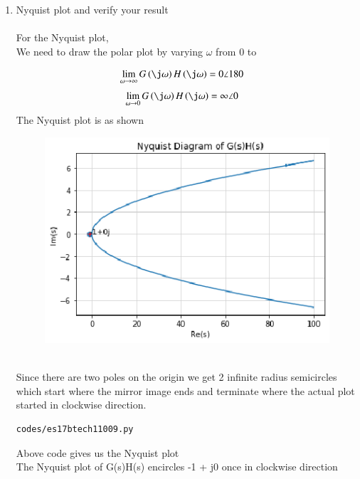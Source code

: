 \begin{enumerate}[label=\thesection.\arabic*.,ref=\thesection.\theenumi]
\item Nyquist plot and verify your result
\\
\solution
\\ For the Nyquist plot, 
\\
We need to draw the polar plot by varying $\omega$ from 0 to \infty

\begin{align}
 \lim_{\omega\to \infty}{G\brak{\j\omega}H\brak{\j\omega}} &= 0\angle{180}
\end{align}
\begin{align}
\lim_{\omega\to 0}{G\brak{\j\omega}H\brak{\j\omega}} &= \infty\angle{0}
\end{align}
The Nyquist plot is as shown

\begin{figure}[!h]
\centering
\includegraphics[width=\columnwidth]{./figs/es17btech11009.eps}
\caption{}
\label{fig:es17btech11009_1}
\end{figure}
\\
Since there are two poles on the origin we get 2 infinite radius semicircles which start where the mirror image ends and terminate where the actual plot started in clockwise direction.
\begin{lstlisting}
codes/es17btech11009.py
\end{lstlisting}

 Above code gives us the Nyquist plot
\\

The Nyquist plot of G(s)H(s) encircles -1 + j0 once in clockwise direction


\end{enumerate}
